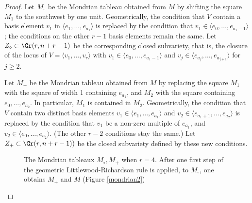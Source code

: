 \begin{proof}
Let $M_{\circ}$ be the Mondrian tableau obtained from $M$ by shifting the square $M_1$ to the southwest by one unit. Geometrically, the condition that $V$ contain a basis element $v_1$ in $\langle e_1,\ldots,e_{a_1}\rangle$ is replaced by the condition that $v_1\in\langle e_0,\ldots,e_{a_1-1}\rangle$; the conditions on the other $r-1$ basis elements remain the same. Let $Z_\circ\subset \Gr(r,n+r-1)$ be the corresponding closed subvariety, that is, the closure of the locus of $V=\langle v_1,\ldots,v_r\rangle$ with $v_1\in\langle e_0,\ldots,e_{a_1-1}\rangle$ and $v_j\in\langle e_{a_j},\ldots,e_{a_{j+1}}\rangle$ for $j\ge2$.

Let $M_+$ be the Mondrian tableau obtained from $M$ by replacing the square $M_1$ with the square of width 1 containing $e_{a_1}$, and $M_2$ with the square containing $e_0,\ldots,e_{a_2}$. In particular, $M_1$ is contained in $M_2$. Geometrically, the condition that $V$ contain two distinct basis elements $v_1\in\langle e_1,\ldots,e_{a_1}\rangle$ and $v_2\in\langle e_{a_1+1},\ldots,e_{a_2}\rangle$ is replaced by the condition that $v_1$ be a non-zero multiple of $e_{a_1}$, and $v_2\in \langle e_0,\ldots,e_{a_2}\rangle$. (The other $r-2$ conditions stay the same.) Let $Z_+\subset \Gr(r,n+r-1))$ be the closed subvariety defined by these new conditions.
\begin{figure}
\caption{The Mondrian tableaux $M_\circ,M_+$ when $r=4$. After one first step of the geometric Littlewood-Richardson rule is applied, to $M_\circ$, one obtains $M_+$ and $M$ (Figure \ref{mondrian2})}\label{mondrian3}
\end{figure}
\end{proof}
